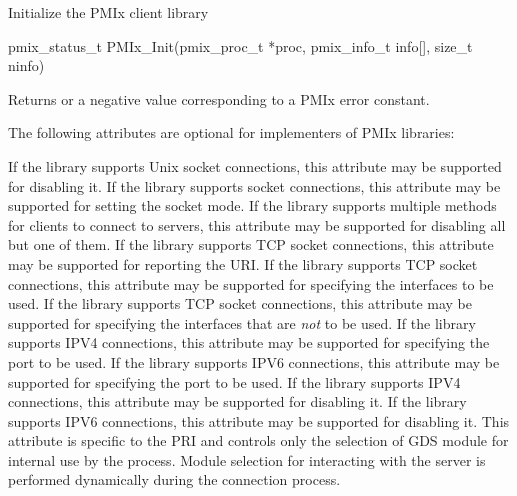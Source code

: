 Initialize the \ac{PMIx} client library

\format

\cspecificstart
\begin{codepar}
pmix_status_t
PMIx_Init(pmix_proc_t *proc,
          pmix_info_t info[], size_t ninfo)
\end{codepar}
\cspecificend

\begin{arglist}
\end{arglist}

Returns  or a negative value corresponding to a \ac{PMIx} error constant.

\optattrstart
The following attributes are optional for implementers of \ac{PMIx} libraries:

 If the library supports Unix socket connections, this attribute may be supported for disabling it.
\pasteAttributeItemEnd{}
 If the library supports socket connections, this attribute may be supported for setting the socket mode.
\pasteAttributeItemEnd{}
 If the library supports multiple methods for clients to connect to servers, this attribute may be supported for disabling all but one of them.
\pasteAttributeItemEnd{}
 If the library supports TCP socket connections, this attribute may be supported for reporting the URI.
\pasteAttributeItemEnd{}
 If the library supports TCP socket connections, this attribute may be supported for specifying the interfaces to be used.
\pasteAttributeItemEnd{}
 If the library supports TCP socket connections, this attribute may be supported for specifying the interfaces that are \textit{not} to be used.
\pasteAttributeItemEnd{}
 If the library supports IPV4 connections, this attribute may be supported for specifying the port to be used.
\pasteAttributeItemEnd{}
 If the library supports IPV6 connections, this attribute may be supported for specifying the port to be used.
\pasteAttributeItemEnd{}
 If the library supports IPV4 connections, this attribute may be supported for disabling it.
\pasteAttributeItemEnd{}
 If the library supports IPV6 connections, this attribute may be supported for disabling it.
\pasteAttributeItemEnd{}
 This attribute is specific to the \ac{PRI} and controls only the selection of \ac{GDS} module for internal use by the process. Module selection for interacting with the server is performed dynamically during the connection process.
\pasteAttributeItemEnd{}
\optattrend

